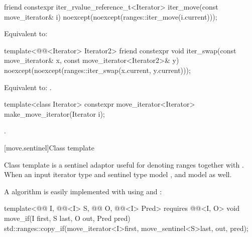 %
\begin{itemdecl}
friend constexpr iter_rvalue_reference_t<Iterator>
  iter_move(const move_iterator& i)
    noexcept(noexcept(ranges::iter_move(i.current)));
\end{itemdecl}

\begin{itemdescr}
\pnum
\effects
Equivalent to: 
\end{itemdescr}

%
\begin{itemdecl}
template<@@<Iterator> Iterator2>
  friend constexpr void
    iter_swap(const move_iterator& x, const move_iterator<Iterator2>& y)
      noexcept(noexcept(ranges::iter_swap(x.current, y.current)));
\end{itemdecl}

\begin{itemdescr}
\pnum
\effects
Equivalent to: .
\end{itemdescr}

%
\begin{itemdecl}
template<class Iterator>
constexpr move_iterator<Iterator> make_move_iterator(Iterator i);
\end{itemdecl}

\begin{itemdescr}
\pnum
\returns
{}.
\end{itemdescr}

[move.sentinel]{Class template }

\pnum
Class template  is a sentinel adaptor useful for denoting
ranges together with . When an input iterator type
 and sentinel type  model ,
 and  model
 as well.

\pnum
\begin{example}
A  algorithm is easily implemented with
 using  and :

\begin{codeblock}
template<@@ I, @@<I> S, @@ O,
         @@<I> Pred>
  requires @@<I, O>
void move_if(I first, S last, O out, Pred pred) {
  std::ranges::copy_if(move_iterator<I>{first}, move_sentinel<S>{last}, out, pred);
}
\end{codeblock}
\end{example}

